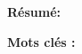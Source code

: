 \vspace*{1cm}
\begin{center}
    \textbf{\huge{Résumé:}}
\end{center}
\vspace{1cm}

\begin{doublespace}

    \textbf{Mots clés :} 
\end{doublespace}